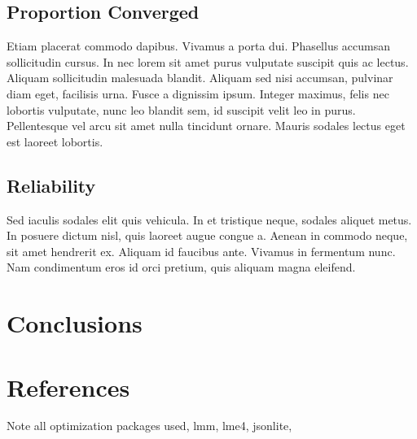\documentclass[article]{jss}
\begin{document}
\subsection[Convergence]{Proportion Converged}
 Etiam placerat commodo dapibus. Vivamus a porta dui. Phasellus accumsan sollicitudin cursus. In nec lorem sit amet purus vulputate suscipit quis ac lectus. Aliquam sollicitudin malesuada blandit. Aliquam sed nisi accumsan, pulvinar diam eget, facilisis urna. Fusce a dignissim ipsum. Integer maximus, felis nec lobortis vulputate, nunc leo blandit sem, id suscipit velit leo in purus. Pellentesque vel arcu sit amet nulla tincidunt ornare. Mauris sodales lectus eget est laoreet lobortis. 

\subsection[Reliablility]{Reliability}

 Sed iaculis sodales elit quis vehicula. In et tristique neque, sodales aliquet metus. In posuere dictum nisl, quis laoreet augue congue a. Aenean in commodo neque, sit amet hendrerit ex. Aliquam id faucibus ante. Vivamus in fermentum nunc. Nam condimentum eros id orci pretium, quis aliquam magna eleifend. 

\section[Conclusions]{Conclusions}

\section[References]{References}

Note all optimization packages used, lmm, lme4, jsonlite, 
\end{document}
